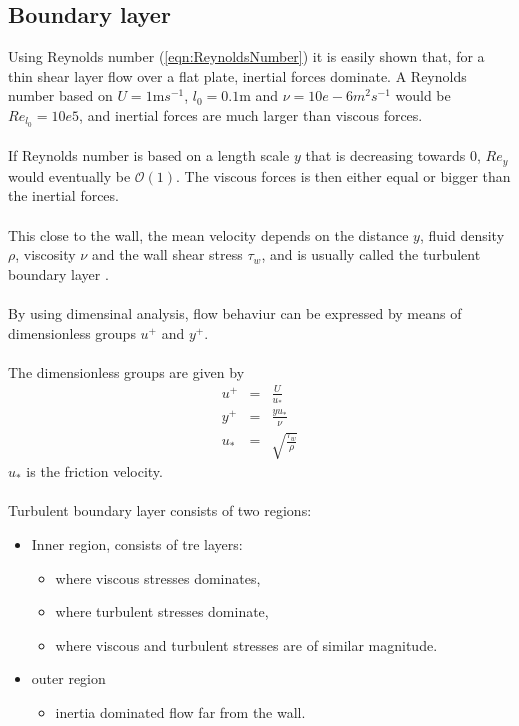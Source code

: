 \documentclass[a4paper, 12pt]{report}
\begin{document}
\subsection{Boundary layer}
Using Reynolds number (\ref{eqn:ReynoldsNumber}) it is easily shown that, for a thin shear layer flow over a flat plate, inertial forces dominate. A Reynolds number based on $U= 1$m$s^{-1}$, $l_0= 0.1$m and $\nu = 10e-6m^2s^{-1}$ would be $Re_{l_0} = 10e5$, and inertial forces are much larger than viscous forces.\\
\\
If Reynolds number is based on a length scale $y$ that is decreasing towards $0$, $Re_y$ would eventually be $\mathcal{O}(1)$. The viscous forces is then either equal or bigger than the inertial forces.\\
\\
This close to the wall, the mean velocity depends on the distance $y$, fluid density $\rho$, viscosity $\nu$ and the wall shear stress $\tau_w$, and is usually called the turbulent boundary layer \cite{CFD}.\\
\\
By using dimensinal analysis, flow behaviur can be expressed by means of dimensionless groups $u^+$ and $y^+$.\\
\\
The dimensionless groups are given by \cite{CFD}
\begin{eqnarray}
\label{eqn:upluss}
u^+ &=& \frac{U}{u_*}\\
\label{eqn:ypluss}
y^+ &=& \frac{y u_*}{\nu}\\
\label{eqn:uStar}
u_* &=& \sqrt{\frac{\tau_w}{\rho}} 
\end{eqnarray}
$u_*$ is the friction velocity.\\
\\
Turbulent boundary layer consists of two regions:
\begin{itemize}
\item Inner region, consists of tre layers:
	\begin{itemize}
	\item where viscous stresses dominates,
	\item where turbulent stresses dominate,
	\item where viscous and turbulent stresses are of similar magnitude.
	\end{itemize}
\item outer region
	\begin{itemize}
	\item inertia dominated flow far from the wall.
	\end{itemize}
\end{itemize}
\end{document}
